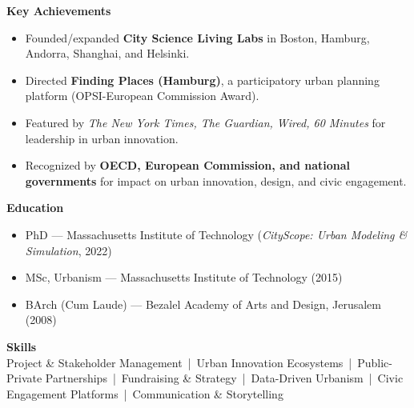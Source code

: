 \documentclass[a4paper,10pt]{article}
\begin{document}
\vspace{2em}

\noindent \textbf{Key Achievements}
\begin{itemize}[leftmargin=1.2em]
    \item Founded/expanded \textbf{City Science Living Labs} in Boston, Hamburg, Andorra, Shanghai, and Helsinki.
    \item Directed \textbf{Finding Places (Hamburg)}, a participatory urban planning platform (OPSI-European Commission Award).
    \item Featured by \emph{The New York Times, The Guardian, Wired, 60 Minutes} for leadership in urban innovation.
    \item Recognized by \textbf{OECD, European Commission, and national governments} for impact on urban innovation, design, and civic engagement.
\end{itemize}

\vspace{0.5em}

\noindent \textbf{Education}
\begin{itemize}[leftmargin=1.2em]
    \item PhD — Massachusetts Institute of Technology (\textit{CityScope: Urban Modeling \& Simulation}, 2022)
    \item MSc, Urbanism — Massachusetts Institute of Technology (2015)
    \item BArch (Cum Laude) — Bezalel Academy of Arts and Design, Jerusalem (2008)
\end{itemize}

\vspace{2em}

\noindent \textbf{Skills} \\
Project \& Stakeholder Management \,|\, Urban Innovation Ecosystems \,|\, Public-Private Partnerships \,|\, Fundraising \& Strategy \,|\, Data-Driven Urbanism \,|\, Civic Engagement Platforms \,|\, Communication \& Storytelling
\end{document}

